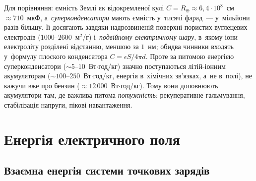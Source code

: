 
Для порівняння: ємність Землі як відокремленої кулі $C = R_\oplus \approx 6{,}4\cdot10^8$~см
$\approx 710$~мкФ, а~\emph{суперконденсатори} мають ємність у~тисячі фарад~--- у~мільйони
разів більшу. Її досягають завдяки надрозвиненій поверхні пористих вуглецевих електродів
($1000$--$2600$~м$^2$/г) і~\emph{подвійному електричному шару}, в~якому іони електроліту
розділені відстанню, меншою за $1$~нм; обидва чинники входять у~формулу плоского
конденсатора $C = \epsilon S/4\pi d$. Проте за питомою енергією суперконденсатори
($\sim5$--$10$~Вт$\cdot$год/кг) значно поступаються літій-іонним акумуляторам
($\sim100$--$250$~Вт$\cdot$год/кг, енергія в~хімічних зв'язках, а~не в~полі), не кажучи вже
про бензин ($\approx12\,000$~Вт$\cdot$год/кг). Тому вони доповнюють акумулятори там, де
важлива питома \emph{потужність}: рекуперативне гальмування, стабілізація напруги, пікові
навантаження.



\section{Енергія електричного поля}\hypertarget{field-energy}{}


\subsection*{Взаємна енергія системи точкових зарядів}


